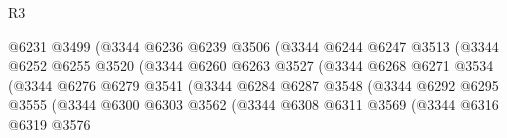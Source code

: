 \begin{lexlean}{R3}
\begin{coremodule}
                                        @6231
                                        @3499
                                        (@3344
                                          @6236
                                          @6239
                                          @3506
                                          (@3344
                                            @6244
                                            @6247
                                            @3513
                                            (@3344
                                              @6252
                                              @6255
                                              @3520
                                              (@3344
                                                @6260
                                                @6263
                                                @3527
                                                (@3344
                                                  @6268
                                                  @6271
                                                  @3534
                                                  (@3344
                                                    @6276
                                                    @6279
                                                    @3541
                                                    (@3344
                                                      @6284
                                                      @6287
                                                      @3548
                                                      (@3344
                                                        @6292
                                                        @6295
                                                        @3555
                                                        (@3344
                                                          @6300
                                                          @6303
                                                          @3562
                                                          (@3344
                                                            @6308
                                                            @6311
                                                            @3569
                                                            (@3344
                                                              @6316
                                                              @6319
                                                              @3576

\end{coremodule}
\end{lexlean}
